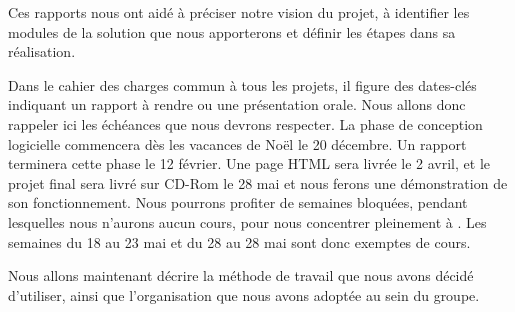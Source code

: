 	Ces rapports nous ont aidé à préciser notre vision du projet, à identifier les modules de la solution que nous apporterons et définir les étapes dans sa réalisation.

	Dans le cahier des charges commun à tous les projets, il figure des dates-clés indiquant un rapport à rendre ou une présentation orale. Nous allons donc rappeler ici les échéances que nous devrons respecter. La phase de conception logicielle commencera dès les vacances de Noël le 20 décembre. Un rapport terminera cette phase le 12 février. Une page HTML sera livrée le 2 avril, et le projet final sera livré sur CD-Rom le 28 mai et nous ferons une démonstration de son fonctionnement.
	Nous pourrons profiter de semaines \og bloquées\fg{}, pendant lesquelles nous n'aurons aucun cours, pour nous concentrer pleinement à \glasir{}. Les semaines du 18 au 23 mai et du 28 au 28 mai sont donc exemptes de cours. 

Nous allons maintenant décrire la méthode de travail que nous avons décidé d'utiliser, ainsi que l'organisation que nous avons adoptée au sein du groupe.
